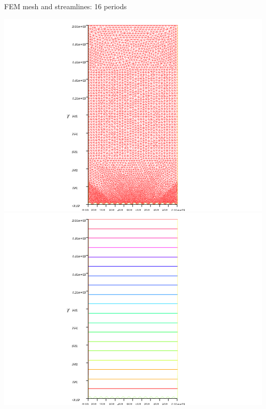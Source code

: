 \documentclass{beamer}
\begin{document}
\begin{frame}{FEM mesh and streamlines: 16 periods}

\begin{center}
\includegraphics[scale=0.4, trim=4cm 0cm 4cm 0cm, clip=true]{FEM_mesh_16.png}
\includegraphics[scale=0.4, trim=4cm 0cm 4cm 0cm, clip=true]{FEM_streamlines_16.png}
\end{center}

\end{frame}
\end{document}

